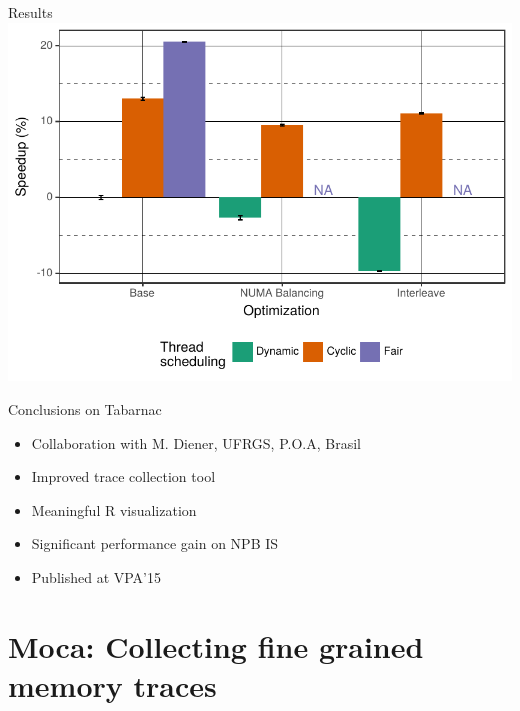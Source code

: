 \documentclass[xcolor={usenames,dvipsnames},hyperref={pdfusetitle}]{beamer}
\begin{document}
\begin{frame}{Results}
    \includegraphics[width=\linewidth]{tabarnac/slides/is_exectime}
\end{frame}


\begin{frame}{Conclusions on Tabarnac}
    \begin{block}{}
        \begin{itemize}
            \item Collaboration with M. Diener, UFRGS, P.O.A, Brasil
            \item Improved trace collection tool
            \item Meaningful R visualization
            \item Significant performance gain on NPB IS
            \item<alert@1-> Published at VPA'15~\cite{Beniamine15TABARNAC}
        \end{itemize}
    \end{block}
\end{frame}

\section{Moca: Collecting fine grained memory traces}
\end{document}
